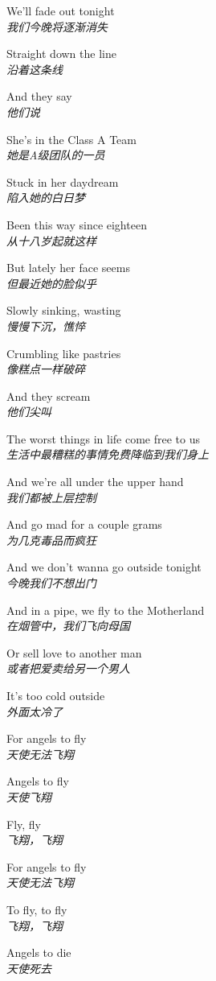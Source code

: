 \begin{spacing}{1.5}
\begin{flushleft}
We'll fade out tonight\\
\textit{我们今晚将逐渐消失}\lyricspace

Straight down the line\\
\textit{沿着这条线}\lyricspace

And they say\\
\textit{他们说}\lyricspace

She's in the Class A Team\\
\textit{她是A级团队的一员}\lyricspace

Stuck in her daydream\\
\textit{陷入她的白日梦}\lyricspace

Been this way since eighteen\\
\textit{从十八岁起就这样}\lyricspace

But lately her face seems\\
\textit{但最近她的脸似乎}\lyricspace

Slowly sinking, wasting\\
\textit{慢慢下沉，憔悴}\lyricspace

Crumbling like pastries\\
\textit{像糕点一样破碎}\lyricspace

And they scream\\
\textit{他们尖叫}\lyricspace

The worst things in life come free to us\\
\textit{生活中最糟糕的事情免费降临到我们身上}\lyricspace

And we're all under the upper hand\\
\textit{我们都被上层控制}\lyricspace

And go mad for a couple grams\\
\textit{为几克毒品而疯狂}\lyricspace

And we don't wanna go outside tonight\\
\textit{今晚我们不想出门}\lyricspace

And in a pipe, we fly to the Motherland\\
\textit{在烟管中，我们飞向母国}\lyricspace

Or sell love to another man\\
\textit{或者把爱卖给另一个男人}\lyricspace

It's too cold outside\\
\textit{外面太冷了}\lyricspace

For angels to fly\\
\textit{天使无法飞翔}\lyricspace

Angels to fly\\
\textit{天使飞翔}\lyricspace

Fly, fly\\
\textit{飞翔，飞翔}\lyricspace

For angels to fly\\
\textit{天使无法飞翔}\lyricspace

To fly, to fly\\
\textit{飞翔，飞翔}\lyricspace

Angels to die\\
\textit{天使死去}\lyricspace
\end{flushleft}
\end{spacing} 
